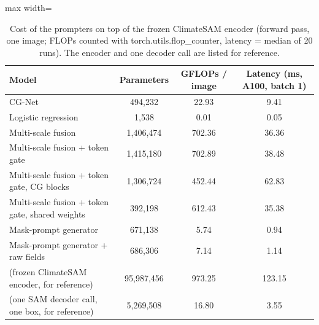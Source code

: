 \begin{table}[htbp]
\centering
\small
\begin{adjustbox}{max width=\linewidth}
\begin{tabular}{lccc}
\toprule
Model & Parameters & GFLOPs / image & Latency (ms, A100, batch 1) \\
\midrule
CG-Net & 494,232 & 22.93 & 9.41 \\
Logistic regression & 1,538 & 0.01 & 0.05 \\
Multi-scale fusion & 1,406,474 & 702.36 & 36.36 \\
Multi-scale fusion + token gate & 1,415,180 & 702.89 & 38.48 \\
Multi-scale fusion + token gate, CG blocks & 1,306,724 & 452.44 & 62.83 \\
Multi-scale fusion + token gate, shared weights & 392,198 & 612.43 & 35.38 \\
Mask-prompt generator & 671,138 & 5.74 & 0.94 \\
Mask-prompt generator + raw fields & 686,306 & 7.14 & 1.14 \\
(frozen ClimateSAM encoder, for reference) & 95,987,456 & 973.25 & 123.15 \\
(one SAM decoder call, one box, for reference) & 5,269,508 & 16.80 & 3.55 \\
\bottomrule
\end{tabular}
\end{adjustbox}
\caption{Cost of the prompters on top of the frozen ClimateSAM encoder (forward pass, one image; FLOPs counted with torch.utils.flop\_counter, latency = median of 20 runs). The encoder and one decoder call are listed for reference.}
\label{tab:speed}
\end{table}
